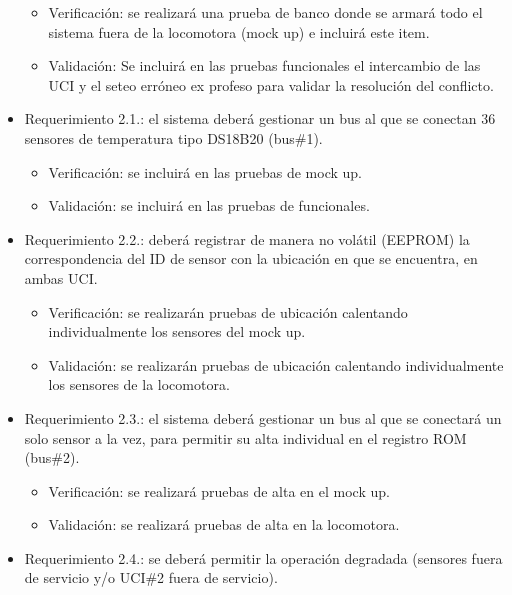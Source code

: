\documentclass[
11pt, %
codirector, %
]{charter}
\begin{document}
\begin{itemize}
\begin{itemize}
	\item Verificación: se realizará una prueba de banco donde se armará todo el sistema fuera de la locomotora (mock up) e incluirá este item.
	\item Validación: Se incluirá en las pruebas funcionales el intercambio de las UCI y el seteo erróneo ex profeso para validar la resolución del conflicto. 
\end{itemize}
\item Requerimiento 2.1.: el sistema deberá gestionar un bus al que se conectan 36 sensores de temperatura tipo DS18B20 (bus\#1).  
\begin{itemize}
	\item Verificación: se incluirá en las pruebas de mock up.  
	\item Validación: se incluirá en las pruebas de funcionales.
\end{itemize}
\item Requerimiento 2.2.: deberá registrar de manera no volátil (EEPROM) la correspondencia del ID de sensor con la ubicación en que se encuentra, en ambas UCI. 
\begin{itemize}
	\item Verificación: se realizarán pruebas de ubicación calentando individualmente los sensores del mock up. 
	\item Validación: se realizarán pruebas de ubicación calentando individualmente los sensores de la locomotora. 
\end{itemize}
\item Requerimiento 2.3.: el sistema deberá gestionar un bus al que se conectará un solo sensor a la vez, para permitir su alta individual en el registro ROM (bus\#2).  
\begin{itemize}
	\item Verificación: se realizará pruebas de alta en el mock up. 
	\item Validación: se realizará pruebas de alta en la locomotora.
\end{itemize}
\item Requerimiento 2.4.: se deberá permitir la operación degradada (sensores fuera de 				servicio y/o UCI\#2 fuera de servicio). 

\end{itemize}
\end{document}
